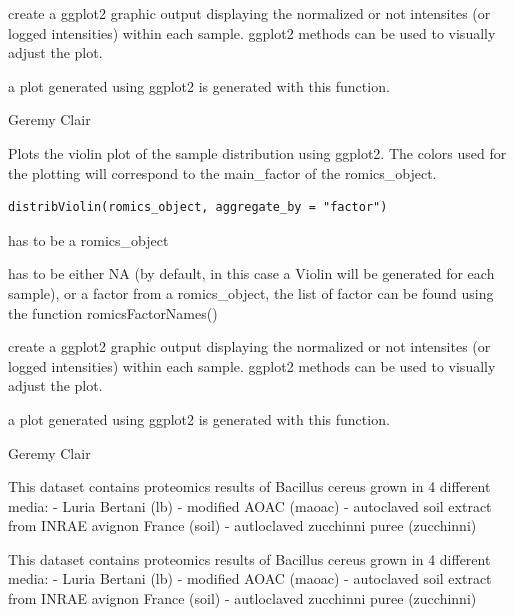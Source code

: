 \documentclass[a4paper]{book}
\begin{document}
%
\begin{Details}
create a ggplot2 graphic output displaying the normalized or not intensites (or logged intensities) within each sample. ggplot2 methods can be used to visually adjust the plot.
\end{Details}
%
\begin{Value}
a plot generated using ggplot2 is generated with this function.
\end{Value}
%
\begin{Author}
Geremy Clair
\end{Author}
%
\begin{Description}
Plots the violin plot of the sample distribution using ggplot2. The colors used for the plotting will correspond to the main\_factor of the romics\_object.
\end{Description}
%
\begin{Usage}
\begin{verbatim}
distribViolin(romics_object, aggregate_by = "factor")
\end{verbatim}
\end{Usage}
%
\begin{Arguments}
\begin{ldescription}
\item[\code{romics\_object}] has to be a romics\_object

\item[\code{aggregate\_by}] has to be either NA (by default, in this case a Violin will be generated for each sample), or a factor from a romics\_object, the list of factor can be found using the function romicsFactorNames()
\end{ldescription}
\end{Arguments}
%
\begin{Details}
create a ggplot2 graphic output displaying the normalized or not intensites (or logged intensities) within each sample. ggplot2 methods can be used to visually adjust the plot.
\end{Details}
%
\begin{Value}
a plot generated using ggplot2 is generated with this function.
\end{Value}
%
\begin{Author}
Geremy Clair
\end{Author}
%
\begin{Description}
This dataset contains proteomics results of Bacillus cereus grown in 4 different media:
- Luria Bertani (lb)
- modified AOAC (maoac)
- autoclaved soil extract from INRAE avignon France (soil)
- autloclaved zucchinni puree (zucchinni)

This dataset contains proteomics results of Bacillus cereus grown in 4 different media:
- Luria Bertani (lb)
- modified AOAC (maoac)
- autoclaved soil extract from INRAE avignon France (soil)
- autloclaved zucchinni puree (zucchinni)
\end{Description}
\end{document}
